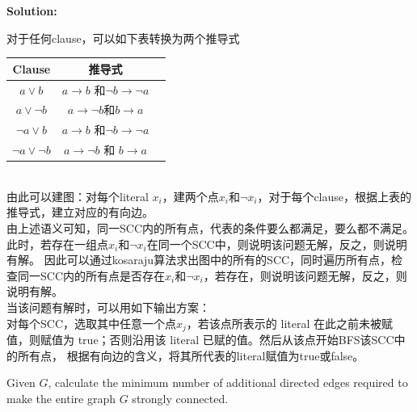 \documentclass{article}
\newcounter{exercise}
\newcommand{\solution}{
    \vspace{0.2in}
    \noindent
    {\bf Solution:}
    }
\newcommand{\<}{
    \langle}
\renewcommand{\>}{
    \rangle}
\begin{document}
{\solution{
对于任何clause，可以如下表转换为两个推导式\\
\begin{table}[h]
    \centering
    \begin{tabular}{|c|c|c|}
        \hline
        Clause & 推导式  \\
        \hline
        $a \lor b$ & $a \to b$ 和$ \neg b \to \neg a$ \\
        \hline
        $a \lor \neg b$ & $a \to \neg b $和$ b \to a$\\
        \hline
        $\neg a \lor b$ & $a \to b$ 和$ \neg b \to \neg a$ \\
        \hline
        $\neg a \lor \neg b$ & $a \to \neg b$ 和 $b \to a$ \\
        \hline
    \end{tabular}
\end{table}\\
由此可以建图：对每个literal $x_i$，建两个点$x_i$和$\neg x_i$，对于每个clause，根据上表的推导式，建立对应的有向边。\\
由上述语义可知，同一SCC内的所有点，代表的条件要么都满足，要么都不满足。此时，若存在一组点$x_i$和$\neg x_i$在同一个SCC中，则说明该问题无解，反之，则说明有解。
因此可以通过kosaraju算法求出图中的所有的SCC，同时遍历所有点，检查同一SCC内的所有点是否存在$x_i$和$\neg x_i$，若存在，则说明该问题无解，反之，则说明有解。\\
当该问题有解时，可以用如下输出方案：\\
对每个SCC，选取其中任意一个点$x_j$，若该点所表示的 literal 在此之前未被赋值，则赋值为 true；否则沿用该 literal 已赋的值。然后从该点开始BFS该SCC中的所有点，
根据有向边的含义，将其所代表的literal赋值为true或false。
}


\begin{exercise}
Given $G$, calculate the minimum number of additional directed edges required to make the entire graph $G$ strongly connected.
\end{exercise}

}
\end{document}
